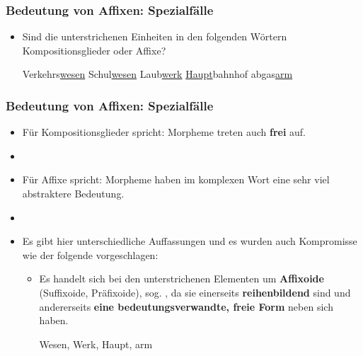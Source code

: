 
\begin{frame}
\frametitle{Bedeutung von Affixen: Spezialfälle}

\begin{itemize}
	\item Sind die unterstrichenen Einheiten in den folgenden Wörtern Kompositionsglieder oder Affixe? 
	
\vspace{1em}
	
	\eal 
	\ex Verkehrs\underline{wesen}
	\ex[]
	\ex Schul\underline{wesen}
	\ex[]
	\ex Laub\underline{werk}
	\ex[]
	\ex \underline{Haupt}bahnhof
	\ex[]
	\ex abgas\underline{arm}
	\zl
	
\end{itemize}

\end{frame}




\begin{frame}
\frametitle{Bedeutung von Affixen: Spezialfälle}

\begin{itemize}
	\item Für Kompositionsglieder spricht: Morpheme treten auch \textbf{frei} auf.
	\item[]
	\item Für Affixe spricht: Morpheme haben im komplexen Wort eine sehr viel abstraktere Bedeutung.
	\item[]
	\item Es gibt hier unterschiedliche Auffassungen und es wurden auch Kompromisse wie der folgende vorgeschlagen:
	
	\begin{itemize}
		\item Es handelt sich bei den unterstrichenen Elementen um \textbf{Affixoide} (Suffixoide, Präfixoide), sog. , da sie einerseits \textbf{reihenbildend} sind und andererseits \textbf{eine bedeutungsverwandte, freie Form} neben sich haben.
		
		\ea Wesen, Werk, Haupt, arm
		\z
		
	\end{itemize}
	
\end{itemize}


\end{frame}


